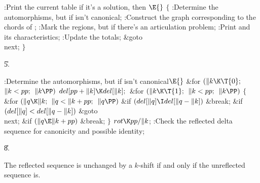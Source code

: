 \fi

\B{}:Print the current  table if it's a
solution, then \X${}\E{}$\6
${}\{{}$\1\6
:Determine the automorphisms, but  if 
isn't canonical\X;\6
:Construct the graph corresponding to the chords of \X;\6
:Mark the regions, but  if there's an articulation
problem\X;\6
:Print  and its characteristics\X;\6
:Update the totals\X;\6
\&{goto} \\{next};\6
\4${}\}{}$\2\par
\U5.\fi

\B{}:Determine the automorphisms, but  if  isn't canonical\X${}\E{}$\6
\&{for} ${}(\|k\K\T{0};{}$ ${}\|k<\\{pp};{}$ ${}\|k\PP){}$\1\5
${}\\{del}[\\{pp}+\|k]\K\\{del}[\|k];{}$\2\6
\&{for} ${}(\|k\K\T{1};{}$ ${}\|k<\\{pp};{}$ ${}\|k\PP){}$\5
${}\{{}$\1\6
\&{for} ${}(\|q\K\|k;{}$ ${}\|q<\|k+\\{pp};{}$ ${}\|q\PP){}$\1\6
\&{if} ${}(\\{del}[\|q]\I\\{del}[\|q-\|k]){}$\1\5
\&{break};\2\2\6
\&{if} ${}(\\{del}[\|q]<\\{del}[\|q-\|k]){}$\1\5
\&{goto} \\{next};\2\6
\&{if} ${}(\|q\E\|k+\\{pp}){}$\1\5
\&{break};\2\6
\4${}\}{}$\2\6
${}\\{rot}\K\\{pp}/\|k{}$;\6
:Check the reflected delta sequence for canonicity and possible identity\X;%
\par
\U8.\fi

The reflected sequence is unchanged by a $k$-shift if
and only if the
unreflected sequence is.

